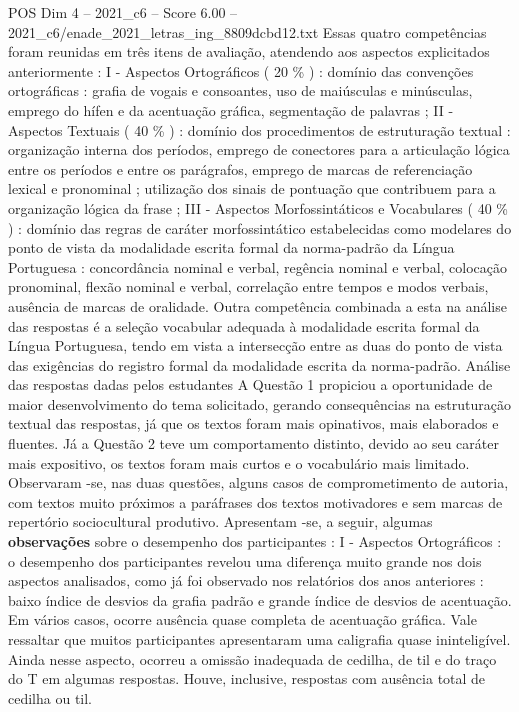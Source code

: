 \begin{textsample}{POS Dim 4 – 2021\_c6 – Score 6.00 – 2021\_c6/enade\_2021\_letras\_ing\_8809dcbd12.txt}
Essas quatro competências foram reunidas em três itens de avaliação, atendendo aos aspectos explicitados anteriormente : I - Aspectos Ortográficos ( 20 \% ) : domínio das convenções ortográficas : grafia de vogais e consoantes, uso de maiúsculas e minúsculas, emprego do hífen e da acentuação gráfica, segmentação de palavras ; II - Aspectos Textuais ( 40 \% ) : domínio dos procedimentos de estruturação textual : organização interna dos períodos, emprego de conectores para a articulação lógica entre os períodos e entre os parágrafos, emprego de marcas de referenciação lexical e pronominal ; utilização dos sinais de pontuação que contribuem para a organização lógica da frase ; III - Aspectos Morfossintáticos e Vocabulares ( 40 \% ) : domínio das regras de caráter morfossintático estabelecidas como modelares do ponto de vista da modalidade escrita formal da norma-padrão da Língua Portuguesa : concordância nominal e verbal, regência nominal e verbal, colocação pronominal, flexão nominal e verbal, correlação entre tempos e modos verbais, ausência de marcas de oralidade.
Outra competência combinada a esta na análise das respostas é a seleção vocabular adequada à modalidade escrita formal da Língua Portuguesa, tendo em vista a intersecção entre as duas do ponto de vista das exigências do registro formal da modalidade escrita da norma-padrão.
Análise das respostas dadas pelos estudantes A Questão 1 propiciou a oportunidade de maior desenvolvimento do tema solicitado, gerando consequências na estruturação textual das respostas, já que os textos foram mais opinativos, mais elaborados e fluentes.
Já a Questão 2 teve um comportamento distinto, devido ao seu caráter mais expositivo, os textos foram mais curtos e o vocabulário mais limitado.
Observaram -se, nas duas questões, alguns casos de comprometimento de autoria, com textos muito próximos a paráfrases dos textos motivadores e sem marcas de repertório sociocultural produtivo.
Apresentam -se, a seguir, algumas \textbf{observações} sobre o desempenho dos participantes : I - Aspectos Ortográficos : o desempenho dos participantes revelou uma diferença muito grande nos dois aspectos analisados, como já foi observado nos relatórios dos anos anteriores : baixo índice de desvios da grafia padrão e grande índice de desvios de acentuação.
Em vários casos, ocorre ausência quase completa de acentuação gráfica.
Vale ressaltar que muitos participantes apresentaram uma caligrafia quase ininteligível.
Ainda nesse aspecto, ocorreu a omissão inadequada de cedilha, de til e do traço do T em algumas respostas.
Houve, inclusive, respostas com ausência total de cedilha ou til.

\end{textsample}
